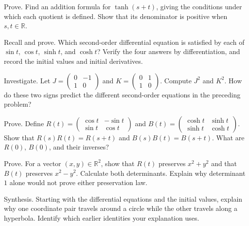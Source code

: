 \documentclass{workbook}
\newcommand{\R}{\mathbb{R}}
\begin{document}
\begin{problem}{Prove.}
Find an addition formula for $\tanh(s+t)$, giving the conditions under
which each quotient is defined. Show that its denominator is positive
when $s,t\in\R$.
\end{problem}

\begin{problem}{Recall and prove.}
Which second-order differential equation is satisfied by each of
$\sin t$, $\cos t$, $\sinh t$, and $\cosh t$? Verify the four answers by
differentiation, and record the initial values and initial derivatives.
\end{problem}

\begin{problem}{Investigate.}
Let $J=\left(\begin{smallmatrix}0&-1\\1&0\end{smallmatrix}\right)$ and
$K=\left(\begin{smallmatrix}0&1\\1&0\end{smallmatrix}\right)$.
Compute $J^2$ and $K^2$. How do these two signs predict the different
second-order equations in the preceding problem?
\end{problem}

\begin{problem}{Prove.}
Define
$R(t)=\left(\begin{smallmatrix}\cos t&-\sin t\\\sin t&\cos t\end{smallmatrix}\right)$
and
$B(t)=\left(\begin{smallmatrix}\cosh t&\sinh t\\\sinh t&\cosh t\end{smallmatrix}\right)$.
Show that $R(s)R(t)=R(s+t)$ and $B(s)B(t)=B(s+t)$.
What are $R(0)$, $B(0)$, and their inverses?
\end{problem}

\begin{problem}{Prove.}
For a vector $(x,y)\in\R^2$, show that $R(t)$ preserves $x^2+y^2$
and that $B(t)$ preserves $x^2-y^2$. Calculate both determinants.
Explain why determinant $1$ alone would not prove either preservation law.
\end{problem}

\begin{problem}{Synthesis.}
Starting with the differential equations and the initial values, explain
why one coordinate pair travels around a circle while the other travels
along a hyperbola. Identify which earlier identities your explanation uses.
\end{problem}
\end{document}
